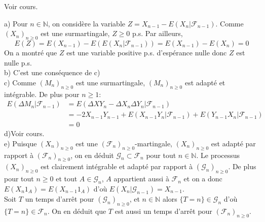 \documentclass[a4, 12pt]{article}
\providecommand{\N}{\mathbb{N}}
\begin{document}
\vspace{1cm}
 Voir cours.
\bigskip

\vspace{1cm}

a) Pour $n\in\N$, on considère la variable $Z=X_{n-1}-E(X_n|\mathcal{F}_{n-1})$. Comme $(X_n)_{n\geq 0}$ est une surmartingale, $Z\geq 0$ p.s. Par ailleurs, 
\begin{equation*}
E(Z)=E(X_{n-1})-E(E(X_n|\mathcal{F}_{n-1}))=E(X_{n-1})-E(X_{n})=0
\end{equation*}
On a montré que $Z$ est une variable positive p.s. d'espérance nulle donc $Z$ est nulle p.s.\\
b) C'est une conséquence de c)\\
c)  Comme $(M_n)_{n\geq 0}$ est une surmartingale, $(M_n)_{n\geq 0}$ est adapté et intégrable. De plus pour $n\geq 1$:
\begin{align*}
E(\Delta M_n|\mathcal{F}_{n-1})&=E(\Delta XY_n - \Delta X_n \Delta Y_n | \mathcal{F}_{n-1})\\
	&=-2 X_{n-1}Y_{n-1}+E(X_{n-1}Y_n|\mathcal{F}_{n-1})+E(Y_{n-1}X_n|\mathcal{F}_{n-1})\\
	&=0
\end{align*}
d)Voir cours.\\
e) Puisque $(X_n)_{n\geq 0}$ est une $(\mathcal{F}_n)_{n\geq 0}$-martingale, $(X_n)_{n\geq 0}$ est adapté par rapport à $(\mathcal{F}_n)_{n\geq 0}$, on en déduit $\mathcal{G}_n \subset \mathcal{F}_n$ pour tout $n\in\N$. Le processus $(X_n)_{n\geq 0}$ est clairement intégrable et adapté par rapport à $(\mathcal{G}_n)_{n\geq 0}$. De plus pour tout $n\geq 0$ et tout $A\in \mathcal{G}_n$, $A$ appartient aussi à $ \mathcal{F}_n$ et on a donc $E(X_n 1_A)=E(X_{n-1}1_A)$ d'où $E(X_n|\mathcal{G}_{n-1})=X_{n-1}$.\\
Soit $T$ un temps d'arrêt pour $(\mathcal{G}_n)_{n\geq 0}$, et $n\in\N$ alors $\{T=n\}\in \mathcal{G}_n$ d'où $\{T=n\}\in \mathcal{F}_n$. On en déduit que $T$ est aussi un temps d'arrêt pour $(\mathcal{F}_n)_{n\geq 0}$.

\bigskip
\end{document}
